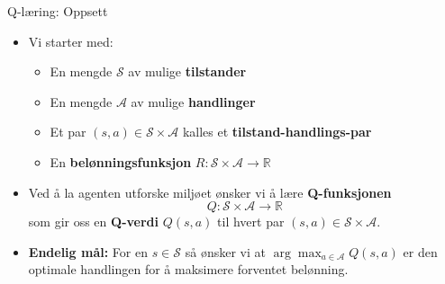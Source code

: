 \documentclass[UKenglish]{beamer}
\begin{document}
\begin{frame}{Q-læring: Oppsett}
	\begin{itemize}
		\setlength\itemsep{0.75em}
		\item Vi starter med:
		\begin{itemize}
			\setlength\itemsep{0.625em}
			\item En mengde $\mathcal{S}$ av mulige \textbf{tilstander}
			\item En mengde $\mathcal{A}$ av mulige \textbf{handlinger}
			\item Et par $(s, a)\in \mathcal{S}\times\mathcal{A}$ kalles et \textbf{tilstand-handlings-par}
			\item En \textbf{belønningsfunksjon} $R\colon\mathcal{S}\times\mathcal{A}\to\mathbb{R}$
		\end{itemize}
	\pause
	
	
	\item Ved å la agenten utforske miljøet ønsker vi å lære \textbf{Q-funksjonen} $$Q\colon\mathcal{S}\times\mathcal{A}\to\mathbb{R}$$ som gir oss en \textbf{Q-verdi} $Q(s,a)$ til hvert par $(s,a)\in\mathcal{S}\times\mathcal{A}$.
	
	\pause
	
	\item \textbf{Endelig mål:} For en $s\in\mathcal{S}$ så ønsker vi at $\arg\max_{a\in\mathcal{A}}Q(s,a)$ er den optimale handlingen for å maksimere forventet belønning.
	\end{itemize}
\end{frame}
\end{document}
